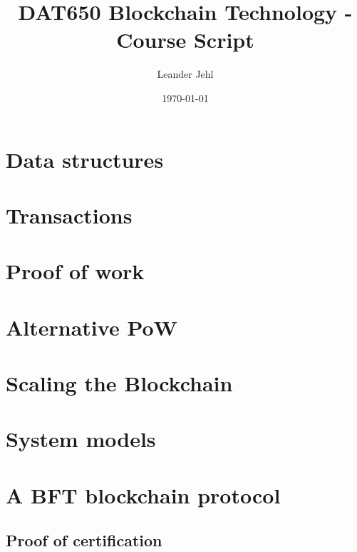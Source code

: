 \documentclass[a4paper,11pt]{report}
\begin{document}
	\title{DAT650 Blockchain Technology - Course Script}
	\author{Leander Jehl}
	\date{\today}
	
	\maketitle

\tableofcontents
\newpage

\chapter{Data structures}
\label{ch:hashchain}
	






\chapter{Transactions}
\label{ch:transaction}



\chapter{Proof of work}




\chapter{Alternative PoW}


\chapter{Scaling the Blockchain}


\chapter{System models}


\chapter{A BFT blockchain protocol}
\label{ch:BFT}
	\section{Proof of certification}
	\label{sec:poc}
	
	
\end{document}
